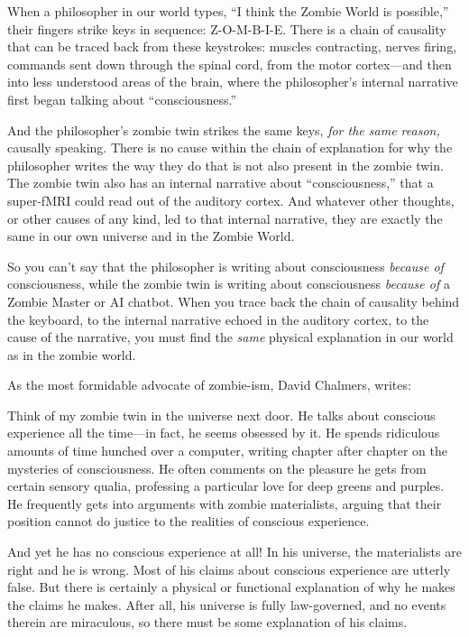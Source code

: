 {
 When a philosopher in our world types, ``I think
the Zombie World is possible,'' their fingers strike
keys in sequence: Z-O-M-B-I-E. There is a chain of causality that can
be traced back from these keystrokes: muscles contracting, nerves
firing, commands sent down through the spinal cord, from the motor
cortex---and then into less understood areas of the brain, where the
philosopher's internal narrative first began talking
about ``consciousness.''}

{
 And the philosopher's zombie twin strikes the same
keys, \textit{for the same reason,} causally speaking. There is no
cause within the chain of explanation for why the philosopher writes
the way they do that is not also present in the zombie twin. The zombie
twin also has an internal narrative about
``consciousness,'' that a super-fMRI
could read out of the auditory cortex. And whatever other thoughts, or
other causes of any kind, led to that internal narrative, they are
exactly the same in our own universe and in the Zombie World.}

{
 So you can't say that the philosopher is writing
about consciousness \textit{because of} consciousness, while the zombie
twin is writing about consciousness \textit{because of} a Zombie Master
or AI chatbot. When you trace back the chain of causality behind the
keyboard, to the internal narrative echoed in the auditory cortex, to
the cause of the narrative, you must find the \textit{same} physical
explanation in our world as in the zombie world.}

{
 As the most formidable advocate of zombie-ism, David Chalmers,
writes:}

{
 Think of my zombie twin in the universe next door. He talks about
conscious experience all the time---in fact, he seems obsessed by it.
He spends ridiculous amounts of time hunched over a computer, writing
chapter after chapter on the mysteries of consciousness. He often
comments on the pleasure he gets from certain sensory qualia,
professing a particular love for deep greens and purples. He frequently
gets into arguments with zombie materialists, arguing that their
position cannot do justice to the realities of conscious experience.}

{
 And yet he has no conscious experience at all! In his universe,
the materialists are right and he is wrong. Most of his claims about
conscious experience are utterly false. But there is certainly a
physical or functional explanation of why he makes the claims he makes.
After all, his universe is fully law-governed, and no events therein
are miraculous, so there must be some explanation of his claims.}

